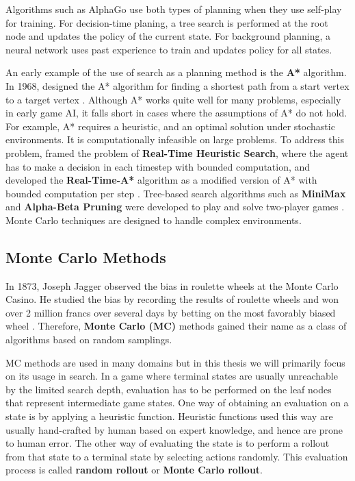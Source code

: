 Algorithms such as AlphaGo use both types of planning when they use self-play for training.
For decision-time planing, a tree search is performed at the root node and updates the policy of the current state.
For background planning, a neural network uses past experience to train and updates policy for all states.

An early example of the use of search as a planning method is the \textbf{A*} algorithm.
In 1968, \citeauthor{FormalBasisHeuristic_Hart.Nilsson.ea_1968} designed the A* algorithm for finding a shortest path from a start vertex to a target vertex \cite{FormalBasisHeuristic_Hart.Nilsson.ea_1968}.
Although A* works quite well for many problems, especially in early game AI, it falls short in cases where the assumptions of A* do not hold.
For example, A* requires a heuristic, and an optimal solution under stochastic environments.
It is computationally infeasible on large problems.
To address this problem, \citeauthor{RealtimeHeuristicSearch_Korf_1990} framed the problem of \textbf{Real-Time Heuristic Search},
where the agent has to make a decision in each timestep with bounded computation, and developed the \textbf{Real-Time-A*} algorithm as a modified version of A* with bounded computation per step \cite{RealtimeHeuristicSearch_Korf_1990}.
Tree-based search algorithms such as \textbf{MiniMax} and \textbf{Alpha-Beta Pruning} were developed to play and solve two-player games \cite{AnalysisAlphaBetaPriming_Knuth.Moore_1975}.
Monte Carlo techniques are designed to handle complex environments.

\subsection{Monte Carlo Methods}
In 1873, Joseph Jagger observed the bias in roulette wheels at the Monte Carlo Casino.
He studied the bias by recording the results of roulette wheels and won over 2 million francs over several days by betting on the most favorably biased wheel \cite{MonteCarloCasino__2022}.
Therefore, \textbf{Monte Carlo (MC)} methods gained their name as a class of algorithms based on random samplings.

MC methods are used in many domains but in this thesis we will primarily focus on its usage in search.
In a game where terminal states are usually unreachable by the limited search depth, evaluation has to be performed on the leaf nodes that represent intermediate game states.
One way of obtaining an evaluation on a state is by applying a heuristic function.
Heuristic functions used this way are usually hand-crafted by human based on expert knowledge, and hence are prone to human error.
The other way of evaluating the state is to perform a rollout from that state to a terminal state by selecting actions randomly.
This evaluation process is called \textbf{random rollout} or \textbf{Monte Carlo rollout}.

